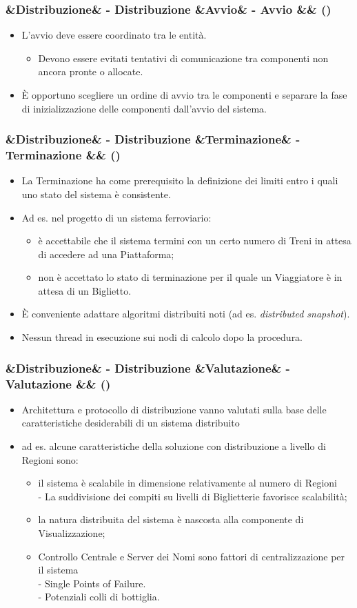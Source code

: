 \documentclass[slidestop,compress,blackandwhite]{beamer}
\newcommand{\ii}[1]{\textit{#1}}
\newcommand{\cm}[1]{\vspace{#1cm}}
\newcommand{\newtitle}[4]{
	#1 
	\ifx&#2&%
	\else
  		\large- #2
	\fi
	\ifx&#3&%
	\else
  		\normalsize- #3
	\fi
	\ifx&#4&%
	\else
  		\normalsize (#4)
	\fi
}
\newcommand{\newframe}[5]{
	\begin{frame}
		\frametitle{\newtitle{#1}{#2}{#3}{#4}}
		#5
	\end{frame}
}
\newcommand{\myitemize}[1]{
	\begin{itemize}\itemsep4pt
	#1
	\end{itemize}
}
\begin{document}
	\newframe{}{Distribuzione}{Avvio}{}{
		\cm{0.5}
		\justifying
		\myitemize{
			\item L'avvio deve essere coordinato tra le entità.
				\cm{0.3}
				\myitemize {
					\item Devono essere evitati tentativi di comunicazione tra componenti non ancora pronte o allocate.
				}
				\cm{0.3}
			\item \`E opportuno scegliere un ordine di avvio tra le componenti e separare la fase di inizializzazione delle componenti dall'avvio del sistema.
		}
		
	}
	
	\newframe{}{Distribuzione}{Terminazione}{}{
		\cm{0.5}
		\myitemize{
			\item La Terminazione ha come prerequisito la definizione dei limiti entro i quali uno stato del sistema è consistente. 
			\item Ad es. nel progetto di un sistema ferroviario:
				\myitemize {
					\item è accettabile che il sistema termini con un certo numero di Treni in attesa di accedere ad una Piattaforma;
					\item non è accettato lo stato di terminazione per il quale un Viaggiatore è in attesa di un Biglietto.
				}
			\item \`E conveniente adattare algoritmi distribuiti noti (ad es. \ii{distributed snapshot}).
			\item Nessun thread in esecuzione sui nodi di calcolo dopo la procedura.
		}
	}
	
	\newframe{}{Distribuzione}{Valutazione}{}{
		\myitemize {
			\item Architettura e protocollo di distribuzione vanno valutati sulla base delle caratteristiche desiderabili di un sistema distribuito
			\item ad es. alcune caratteristiche della soluzione con distribuzione a livello di Regioni sono:
				\myitemize {
					\item il sistema è scalabile in dimensione relativamente al numero di Regioni\\
						- La suddivisione dei compiti su livelli di Biglietterie favorisce scalabilità;
					\item la natura distribuita del sistema è nascosta alla componente di Visualizzazione;
					\item Controllo Centrale e Server dei Nomi sono fattori di centralizzazione per il sistema \\
						- Single Points of Failure.\\
						- Potenziali colli di bottiglia.\\
				}
		}
	}
	
\end{document}
